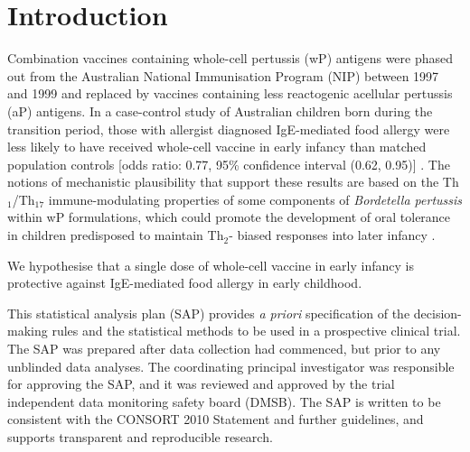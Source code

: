 \documentclass{bmcart}
\begin{document}


\section*{Introduction}

Combination vaccines containing whole-cell pertussis (wP) antigens were phased out from the Australian National Immunisation Program (NIP) between 1997 and 1999 and replaced by vaccines containing less reactogenic acellular pertussis (aP) antigens.
In a case-control study of Australian children born during the transition period, those with allergist diagnosed IgE-mediated food allergy were less likely to have received whole-cell vaccine in early infancy than matched population controls [odds ratio: 0.77, 95\% confidence interval (0.62, 0.95)] \cite{estcourt2020whole}.
The notions of mechanistic plausibility that support these results are based on the Th$_1$/Th$_{17}$ immune-modulating properties of some components of \textit{Bordetella pertussis} within wP formulations, which could promote the development of oral tolerance in children predisposed to maintain Th$_2$- biased responses into later infancy \cite{perez2020}.

We hypothesise that a single dose of whole-cell vaccine in early infancy is protective against IgE-mediated food allergy in early childhood.

This statistical analysis plan (SAP) provides \textit{a priori} specification of the decision-making rules and the statistical methods to be used in a prospective clinical trial. 
The SAP was prepared after data collection had commenced, but prior to any unblinded data analyses. 
The coordinating principal investigator was responsible for approving the SAP, and it was reviewed and approved by the trial independent data monitoring safety board (DMSB). 
The SAP is written to be consistent with the CONSORT 2010 Statement and further guidelines, and supports transparent and reproducible research.
\end{document}

